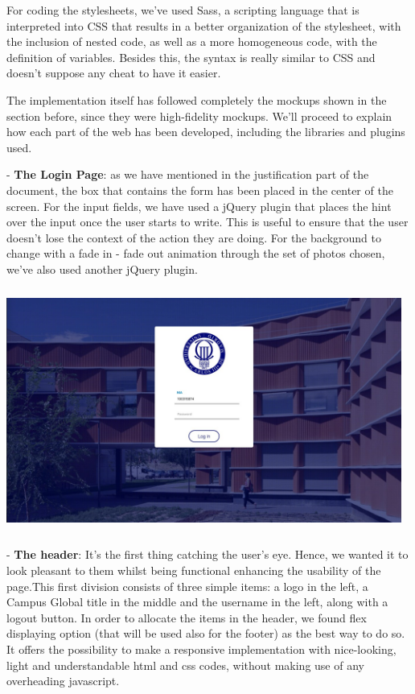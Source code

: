 \documentclass{article}
\begin{document}
For coding the stylesheets, we've used Sass, a scripting language that is interpreted into CSS that results in a better organization of the stylesheet, with the inclusion of nested code, as well as a more homogeneous code, with the definition of variables. Besides this, the syntax is really similar to CSS and doesn't suppose any cheat to have it easier.

The implementation itself has followed completely the mockups shown in the section before, since they were high-fidelity mockups. We'll proceed to explain how each part of the web has been developed, including the libraries and plugins used.

- \textbf{The Login Page}:  as we have mentioned in the justification part of the document, the box that contains the form has been placed in the center of the screen. For the input fields, we have used a jQuery plugin that places the hint over the input once the user starts to write. This is useful to ensure that the user doesn't lose the context of the action they are doing. For the background to change with a fade in - fade out animation through the set of photos chosen, we've also used another jQuery plugin.
\begin{center} 
\includegraphics[width=13cm, height=8cm, keepaspectratio]{imp_login}
\end{center} 

- \textbf{The header}: It's the first thing catching the user’s eye. Hence, we wanted it to look pleasant to them whilst being functional enhancing the usability of the page.This first division consists of three simple items: a logo in the left, a Campus Global title in the middle and the username in the left, along with a logout button. In order to allocate the items in the header, we found flex displaying option (that will be used also for the footer) as the best way to do so. It offers the possibility to make a responsive implementation with nice-looking, light and understandable html and css codes, without making use of any overheading javascript.
\end{document}
